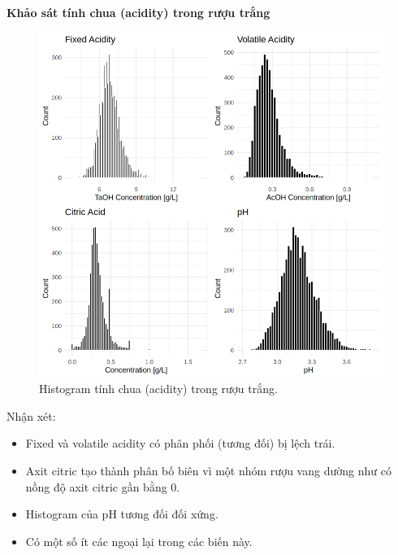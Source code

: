 \textbf{Khảo sát tính chua (acidity) trong rượu trắng}
\begin{figure}[H]
    \centering
    \includegraphics[width=0.75\columnwidth]{wine_figures/white_acidity.png}
    \caption{Histogram tính chua (acidity) trong rượu trắng.}
    \label{fig:white_acidity}
\end{figure}
Nhận xét:
\begin{itemize}
    \item Fixed và volatile acidity có phân phối (tương đối) bị lệch trái.
    \item Axit citric tạo thành phân bố biên vì một nhóm rượu vang dường như có nồng độ axit citric gần bằng 0.
    \item Histogram của pH tương đối đối xứng.
    \item Có một số ít các ngoại lại trong các biến này.
\end{itemize}

